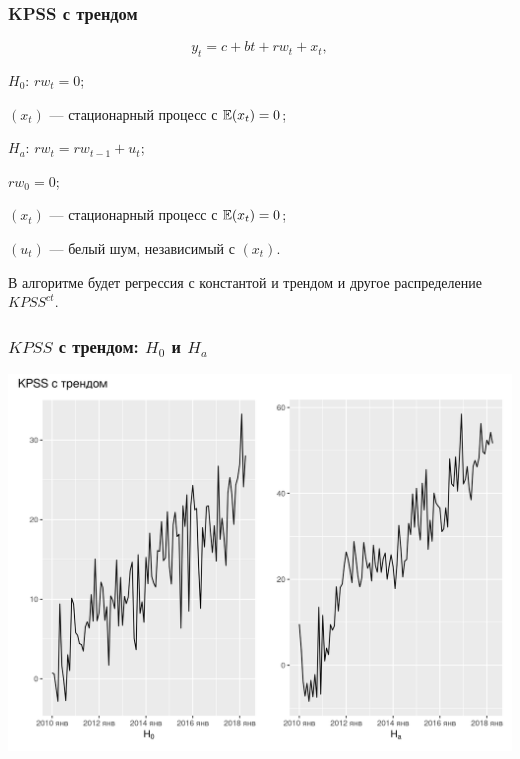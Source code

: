   
  \begin{frame}
    \frametitle{KPSS с трендом}
    \[
      y_t = c + bt + rw_t + x_t,
    \]
  
    \pause
  
    \alert{$H_0$: $rw_t = 0$};
    
    $(x_t)$ — стационарный процесс с $\mathbb{E}(x_t) = 0$;
    
    \pause
  
    \alert{$H_a$: $rw_t = rw_{t-1} + u_t$};

    $rw_0 = 0$;
  
    $(x_t)$ — стационарный процесс с $\mathbb{E}(x_t) = 0$;

    $(u_t)$ — белый шум, независимый с $(x_t)$.
  
    \pause 
  
    В алгоритме будет регрессия \alert{с константой и трендом} и другое распределение $KPSS^{ct}$.
  
  \end{frame}
  
  
  \begin{frame}
    \frametitle{$KPSS$ с трендом: $H_0$ и $H_a$}
    \includegraphics[width=\textwidth]{pictures/om_ts_06-086.png}
  \end{frame}
  
